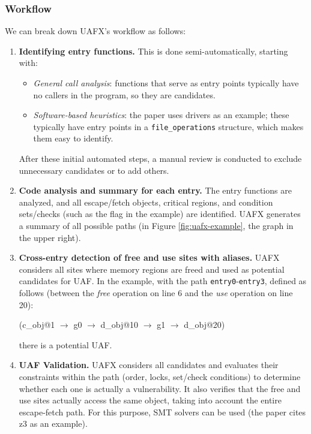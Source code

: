 \subsubsection{Workflow}
We can break down UAFX's workflow as follows:
\begin{enumerate}
    \item \textbf{Identifying entry functions.} This is done semi-automatically, starting with:
    \begin{itemize}
        \item \textit{General call analysis}: functions that serve as entry points typically have no callers in the program, so they are candidates.
        \item \textit{Software-based heuristics}: the paper uses drivers as an example; these typically have entry points in a \texttt{file\_operations} structure, which makes them easy to identify.
    \end{itemize}
    After these initial automated steps, a manual review is conducted to exclude unnecessary candidates or to add others.

    \item \textbf{Code analysis and summary for each entry.} The entry functions are analyzed, and all escape/fetch objects, critical regions, and condition sets/checks (such as the flag in the example) are identified. UAFX generates a summary of all possible paths (in Figure \ref{fig:uafx-example}, the graph in the upper right).

    \item \textbf{Cross-entry detection of free and use sites with aliases.} UAFX considers all sites where memory regions are freed and used as potential candidates for UAF. In the example, with the path \texttt{entry0}-\texttt{entry3}, defined as follows (between the \textit{free} operation on line 6 and the \textit{use} operation on line 20):
    \begin{center}
        (c\_obj@1 $\longrightarrow$ g0 $\longrightarrow$ d\_obj@10 $\longrightarrow$ g1 $\longrightarrow$ d\_obj@20)
    \end{center}
    there is a potential UAF.

    \item \textbf{UAF Validation.} UAFX considers all candidates and evaluates their constraints within the path (order, locks, set/check conditions) to determine whether each one is actually a vulnerability.
    It also verifies that the free and use sites actually access the same object, taking into account the entire escape-fetch path.
    For this purpose, SMT solvers can be used (the paper cites z3 \cite{bib:z3} as an example).
\end{enumerate}

